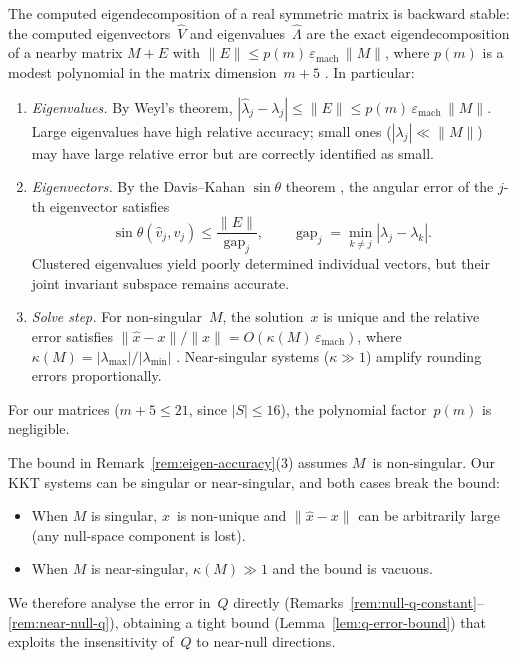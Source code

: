 \begin{remark}%
\label{rem:eigen-accuracy}
The computed eigendecomposition of a real symmetric matrix
is backward stable: the computed eigenvectors~$\hat V$ and
eigenvalues~$\hat\Lambda$ are the exact eigendecomposition
of a nearby matrix $M + E$ with
$\|E\| \leq p(m)\,\varepsilon_{\mathrm{mach}}\,\|M\|$,
where $p(m)$ is a modest polynomial in the matrix
dimension~$m + 5$
\cite[Ch.~8]{GolubVanLoan2013}.
In particular:
\begin{enumerate}
\item \emph{Eigenvalues.}
  By Weyl's theorem,
  $|\hat\lambda_j - \lambda_j| \leq \|E\|
    \leq p(m)\,\varepsilon_{\mathrm{mach}}\,\|M\|$.
  Large eigenvalues have high relative accuracy;
  small ones ($|\lambda_j| \ll \|M\|$) may have large
  relative error but are correctly identified as small.
\item \emph{Eigenvectors.}
  By the Davis--Kahan $\sin\theta$ theorem
  \cite[Ch.~8]{GolubVanLoan2013},
  the angular error of the $j$-th eigenvector satisfies
  \[
    \sin\theta(\hat v_j, v_j)
      \leq \frac{\|E\|}{\operatorname{gap}_j},
    \qquad
    \operatorname{gap}_j
      = \min_{k \neq j} |\lambda_j - \lambda_k|.
  \]
  Clustered eigenvalues yield poorly determined
  individual vectors, but their joint invariant subspace
  remains accurate.
\item \emph{Solve step.}
  For non-singular~$M$, the solution~$x$ is unique and
  the relative error satisfies
  $\|\hat x - x\| / \|x\|
    = O(\kappa(M)\,\varepsilon_{\mathrm{mach}})$,
  where $\kappa(M) = |\lambda_{\max}| / |\lambda_{\min}|$
  \cite[Ch.~5]{Higham2002}.
  Near-singular systems ($\kappa \gg 1$) amplify
  rounding errors proportionally.
\end{enumerate}
For our matrices ($m + 5 \leq 21$, since $|S| \leq 16$),
the polynomial factor~$p(m)$ is negligible.
\end{remark}

\begin{remark}%
\label{rem:solve-step-warning}
The bound in Remark~\ref{rem:eigen-accuracy}(3)
assumes $M$~is non-singular.
Our KKT systems can be singular or near-singular,
and both cases break the bound:
\begin{itemize}
\item When $M$ is singular, $x$~is non-unique and
  $\|\hat x - x\|$ can be arbitrarily large
  (any null-space component is lost).
\item When $M$ is near-singular,
  $\kappa(M) \gg 1$ and the bound is vacuous.
\end{itemize}
We therefore analyse the error in~$Q$ directly
(Remarks~\ref{rem:null-q-constant}--\ref{rem:near-null-q}),
obtaining a tight bound
(Lemma~\ref{lem:q-error-bound})
that exploits the insensitivity of~$Q$
to near-null directions.
\end{remark}

